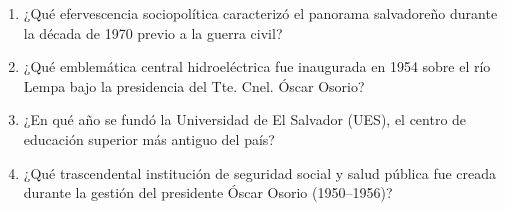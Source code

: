 \documentclass[10pt,a4paper]{article}
\begin{document}
\begin{enumerate}[label=\textbf{\arabic*.}]
\begin{enumerate}[label=\textbf{\Alph*)}]
\begin{multicols}{2}
\end{multicols}
\end{enumerate}
\vspace{0.15cm}
\item ¿Qué efervescencia sociopolítica caracterizó el panorama salvadoreño durante la década de 1970 previo a la guerra civil?
\begin{enumerate}[label=\textbf{\Alph*)}]
\end{enumerate}
\vspace{0.15cm}
\item ¿Qué emblemática central hidroeléctrica fue inaugurada en 1954 sobre el río Lempa bajo la presidencia del Tte. Cnel. Óscar Osorio?
\begin{enumerate}[label=\textbf{\Alph*)}]
\end{enumerate}
\vspace{0.15cm}
\item ¿En qué año se fundó la Universidad de El Salvador (UES), el centro de educación superior más antiguo del país?
\begin{enumerate}[label=\textbf{\Alph*)}]
\end{enumerate}
\vspace{0.15cm}
\item ¿Qué trascendental institución de seguridad social y salud pública fue creada durante la gestión del presidente Óscar Osorio (1950–1956)?

\end{enumerate}
\end{document}
